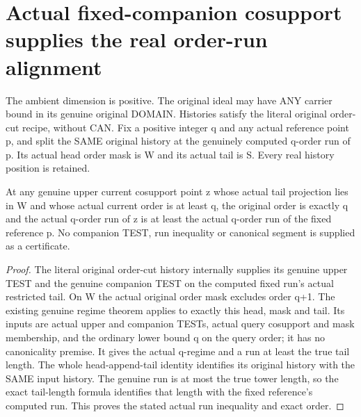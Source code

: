 \section{Actual fixed-companion cosupport supplies the real order-run alignment}

The ambient dimension is positive. The original ideal may have ANY carrier
bound in its genuine original DOMAIN. Histories satisfy the literal original
order-cut recipe, without CAN. Fix a positive integer q and any actual
reference point p, and split the SAME original history at the genuinely
computed q-order run of p. Its actual head order mask is W and its actual
tail is S. Every real history position is retained.

\begin{theorem}
\label{hir:original-fixed-order-mask-query-run-bound}
\leanok
At any genuine upper current cosupport point z whose actual tail projection
lies in W and whose actual current order is at least q, the original order
is exactly q and the actual q-order run of z is at least the actual q-order
run of the fixed reference p. No companion TEST, run inequality or canonical
segment is supplied as a certificate.
\end{theorem}
\begin{proof}
The literal original order-cut history internally supplies its genuine upper
TEST and the genuine companion TEST on the computed fixed run's actual
restricted tail. On W the actual original order mask excludes order q+1.
The existing genuine regime theorem applies to exactly this head, mask and
tail. Its inputs are actual upper and companion TESTs, actual query
cosupport and mask membership, and the ordinary lower bound q on the query
order; it has no canonicality premise. It gives the actual q-regime and a
run at least the true tail length. The whole head-append-tail identity
identifies its original history with the SAME input history. The genuine
run is at most the true tower length, so the exact tail-length formula
identifies that length with the fixed reference's computed run. This
proves the stated actual run inequality and exact order.
\end{proof}

